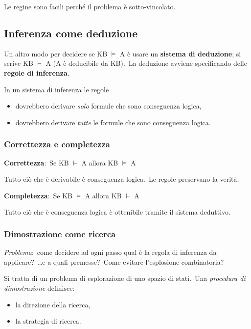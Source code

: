 Le regine sono facili perché il problema è sotto-vincolato.

\subsection{Inferenza come deduzione}

Un altro modo per decidere se KB $\models$ A è usare un \textbf{sistema di deduzione}; si scrive KB $\vdash$ A  (A è deducibile da KB).\
La deduzione avviene specificando delle \textbf{regole di inferenza}.

In un sistema di inferenza le regole
\begin{itemize}
	\item dovrebbero derivare \textit{solo} formule che sono conseguenza logica,
	\item dovrebbero derivare \textit{tutte} le formule che sono conseguenza logica.
\end{itemize}

\subsubsection{Correttezza e completezza}
\begin{center}
	\textbf{Correttezza}:\ Se KB $\vdash$ A allora KB $\models$ A
\end{center}
Tutto ciò che è derivabile è conseguenza logica.\ Le regole preservano la verità.
\begin{center}
	\textbf{Completezza}:\ Se KB $\models$ A allora KB $\vdash$ A
\end{center}
Tutto ciò che è conseguenza logica è ottenibile tramite il sistema deduttivo.

\subsubsection{Dimostrazione come ricerca}

\textit{Problema}:\ come decidere ad ogni passo qual è la regola di inferenza da applicare?\ \dots e a quali premesse?\ Come evitare l'esplosione combinatoria?

Si tratta di un problema di esplorazione di uno spazio di stati.\
Una \textit{procedura di dimostrazione} definisce:
\begin{itemize}
	\item la direzione della ricerca,
	\item la strategia di ricerca.
\end{itemize}

